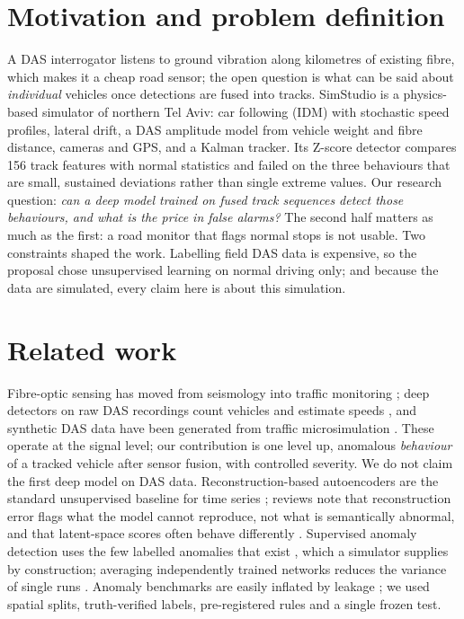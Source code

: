 \documentclass[10pt,a4paper,twocolumn]{article}
\begin{document}
\section{Motivation and problem definition}
A DAS interrogator listens to ground vibration along kilometres of existing fibre, which makes it a cheap road sensor; the open question is what can be said about \emph{individual} vehicles once detections are fused into tracks. SimStudio is a physics-based simulator of northern Tel Aviv: car following (IDM) with stochastic speed profiles, lateral drift, a DAS amplitude model from vehicle weight and fibre distance, cameras and GPS, and a Kalman tracker. Its Z-score detector compares 156 track features with normal statistics and failed on the three behaviours that are small, sustained deviations rather than single extreme values. Our research question: \emph{can a deep model trained on fused track sequences detect those behaviours, and what is the price in false alarms?} The second half matters as much as the first: a road monitor that flags normal stops is not usable. Two constraints shaped the work. Labelling field DAS data is expensive, so the proposal chose unsupervised learning on normal driving only; and because the data are simulated, every claim here is about this simulation.

\section{Related work}
Fibre-optic sensing has moved from seismology into traffic monitoring \cite{lindsey2021}; deep detectors on raw DAS recordings count vehicles and estimate speeds \cite{ye2023}, and synthetic DAS data have been generated from traffic microsimulation \cite{robles2025}. These operate at the signal level; our contribution is one level up, anomalous \emph{behaviour} of a tracked vehicle after sensor fusion, with controlled severity. We do not claim the first deep model on DAS data. Reconstruction-based autoencoders are the standard unsupervised baseline for time series \cite{sakurada2014,audibert2020}; reviews note that reconstruction error flags what the model cannot reproduce, not what is semantically abnormal, and that latent-space scores often behave differently \cite{ruff2021}. Supervised anomaly detection uses the few labelled anomalies that exist \cite{pang2021}, which a simulator supplies by construction; averaging independently trained networks reduces the variance of single runs \cite{lakshminarayanan2017}. Anomaly benchmarks are easily inflated by leakage \cite{wu2023,kaufman2012}; we used spatial splits, truth-verified labels, pre-registered rules and a single frozen test.
\end{document}

